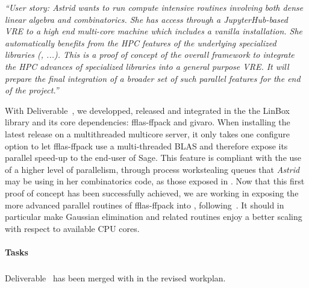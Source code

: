 \emph{“User story: Astrid wants to run compute intensive routines
    involving both dense linear algebra and combinatorics. She has
    access through a JupyterHub-based VRE to a high end multi-core
    machine which includes a vanilla \Sage installation. She
    automatically benefits from the HPC features of the underlying
    specialized libraries (\Linbox, ...). This is a proof of concept
    of the overall framework to integrate the HPC advances of
    specialized libraries into a general purpose VRE.
    It will prepare the final integration of a broader set of such
    parallel features for the end of the project.”}

With Deliverable~, we developped, released and integrated in the
\Sage the LinBox library and its core dependencies: fflas-ffpack and givaro.
When installing the latest \Sage release on a multithreaded multicore server, it
only takes one configure option to let fflas-ffpack use a multi-threaded BLAS
and therefore expose its parallel speed-up to the end-user of Sage. This feature
is compliant with the use of a higher level of parallelism, through process
workstealing queues that \textit{Astrid} may be using in her combinatorics code, as those
exposed in . Now that this first proof of concept has been
successfully achieved, we are working in exposing the more advanced parallel
routines of fflas-ffpack into \Sage, following~. It
should in particular make Gaussian elimination and related routines enjoy a
better scaling with respect to available CPU cores.



\paragraph{Tasks}

\subparagraph{}
Deliverable~ has been merged
 with  in the revised workplan.

